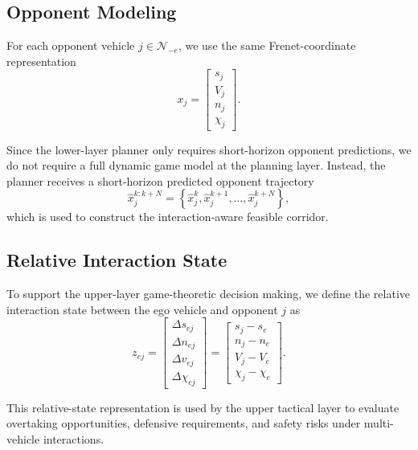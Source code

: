 \documentclass[final ,3p, times]{elsarticle}
\begin{document}
\subsection{Opponent Modeling}
\label{subsec:opponent_modeling}

For each opponent vehicle $j \in \mathcal{N}_{-e}$, we use the same Frenet-coordinate representation
\begin{equation}
x_j =
\begin{bmatrix}
s_j \\
V_j \\
n_j \\
\chi_j
\end{bmatrix}.
\label{eq:opponent_state}
\end{equation}

Since the lower-layer planner only requires short-horizon opponent predictions, we do not require a full dynamic game model at the planning layer. Instead, the planner receives a short-horizon predicted opponent trajectory
\begin{equation}
\hat x_j^{k:k+N}
=
\left\{
\hat x_j^k,\hat x_j^{k+1},\dots,\hat x_j^{k+N}
\right\},
\label{eq:opponent_prediction}
\end{equation}
which is used to construct the interaction-aware feasible corridor.

\subsection{Relative Interaction State}
\label{subsec:relative_interaction_model}

To support the upper-layer game-theoretic decision making, we define the relative interaction state between the ego vehicle and opponent $j$ as
\begin{equation}
z_{ej}=
\begin{bmatrix}
\Delta s_{ej}\\
\Delta n_{ej}\\
\Delta v_{ej}\\
\Delta \chi_{ej}
\end{bmatrix}
=
\begin{bmatrix}
s_j-s_e\\
n_j-n_e\\
V_j-V_e\\
\chi_j-\chi_e
\end{bmatrix}.
\label{eq:relative_state_modeling}
\end{equation}

This relative-state representation is used by the upper tactical layer to evaluate overtaking opportunities, defensive requirements, and safety risks under multi-vehicle interactions.
\end{document}
